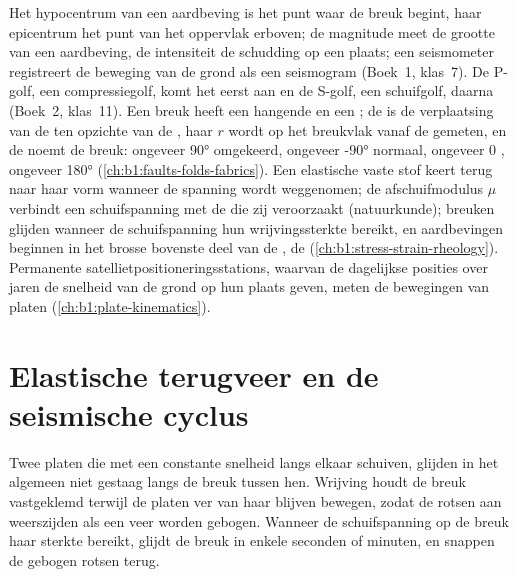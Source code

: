 \begin{recall}
Het hypocentrum van een aardbeving is het punt waar de breuk begint, haar epicentrum het punt van het oppervlak erboven; de magnitude meet de grootte van een aardbeving, de intensiteit de schudding op een plaats; een seismometer registreert de beweging van de grond als een seismogram (Boek~1, klas~7). De P-golf, een compressiegolf, komt het eerst aan en de S-golf, een schuifgolf, daarna (Boek~2, klas~11). Een breuk heeft een hangende en een ; de  is de verplaatsing van de  ten opzichte van de , haar  $r$ wordt op het breukvlak vanaf de  gemeten, en de  noemt de breuk: ongeveer \ang{90} omgekeerd, ongeveer \ang{-90} normaal, ongeveer 0 , ongeveer \ang{180}  (\cref{ch:b1:faults-folds-fabrics}). Een elastische vaste stof keert terug naar haar vorm wanneer de spanning wordt weggenomen; de afschuifmodulus $\mu$ verbindt een schuifspanning met de  die zij veroorzaakt (natuurkunde); breuken glijden wanneer de schuifspanning hun wrijvingssterkte bereikt, en aardbevingen beginnen in het brosse bovenste deel van de , de  (\cref{ch:b1:stress-strain-rheology}). Permanente satellietpositioneringsstations, waarvan de dagelijkse posities over jaren de snelheid van de grond op hun plaats geven, meten de bewegingen van platen (\cref{ch:b1:plate-kinematics}).
\end{recall}

\section{Elastische terugveer en de seismische cyclus}\label{sec:b1:earthquake-source:cycle}

Twee platen die met een constante snelheid langs elkaar schuiven, glijden in het algemeen niet gestaag langs de breuk tussen hen. Wrijving houdt de breuk vastgeklemd terwijl de platen ver van haar blijven bewegen, zodat de rotsen aan weerszijden als een veer worden gebogen. Wanneer de schuifspanning op de breuk haar sterkte bereikt, glijdt de breuk in enkele seconden of minuten, en snappen de gebogen rotsen terug.

